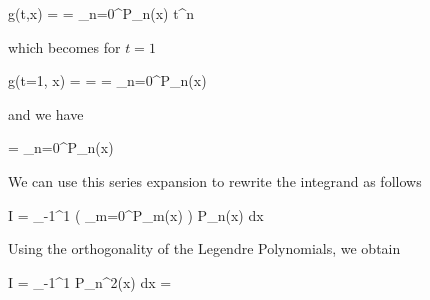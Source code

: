 \bee
g(t,x) =  = \sum_{n=0}^\infty P_n(x) t^n
\eee

which becomes for $t=1$

\bee
g(t=1, x) =  =   = \sum_{n=0}^\infty P_n(x)
\eee

and we have

\bee
{} =  \sum_{n=0}^\infty P_n(x)
\eee

We can use this series expansion to rewrite the integrand as follows

\bee
I =  \int_{-1}^1 \left( \sum_{m=0}^\infty P_m(x) \right) P_n(x) dx
\eee

Using the orthogonality of the Legendre Polynomials, we obtain

\bee
I =  \int_{-1}^1 P_n^2(x) dx = 
\eee


